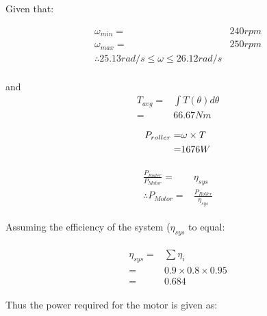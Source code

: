 \documentclass[12pt]{article}
\begin{document}
\begin{large}  
\tableofcontents
\end{large}

\listoffigures
\listoftables
\newpage

\section{}
\justifying
Given that: 

\begin{center}
\begin{align*}
\omega_{min} =& 240 rpm \\
\omega_{max} =& 250 rpm \\
\therefore 25.13 rad/s \leq \omega \leq 26.12 rad/s \\
\end{align*}
\end{center}

and
\begin{align*}
    T_{avg} =& \int T(\theta) d\theta\\
    =& 66.67 Nm
\end{align*}

\begin{align}
\begin{split}
P_{roller} =& \omega \times T \\ \vspace{0.5cm}
=& 1676 W
\end{split}
\end{align}


\begin{align}
\begin{split}
    \frac{P_{Roller}}{P_{Motor}} =& \eta_{sys} \\
    \therefore P_{Motor} =& \frac{P_{Roller}}{\eta_{sys}}
\end{split}
\end{align}

Assuming the efficiency of the system ($\eta_{sys}$ to equal:

\begin{align}
    \begin{split}
        \eta_{sys} =& \sum{\eta_i} \\
        =& 0.9 \times 0.8 \times 0.95 \\
        =& 0.684
    \end{split}
\end{align}

Thus the power required for the motor is given as:
\end{document}
